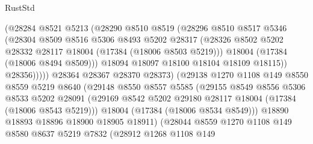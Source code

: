 \begin{lexlean}{RustStd}
\begin{coremodule}
                          (@28284
                            @8521
                            @5213
                            (@28290
                              @8510
                              @8519
                              (@28296
                                @8510
                                @8517
                                @5346
                                (@28304
                                  @8509
                                  @8516
                                  @5306
                                  @8493
                                  @5202
                                  @28317
                                  (@28326
                                    @8502
                                    @5202
                                    @28332
                                    @28117
                                    @18004
                                    (@17384 (@18006 @8503 @5219)))
                                  @18004
                                  (@17384 (@18006 @8494 @8509)))
                                @18094
                                @18097
                                @18100
                                @18104
                                @18109
                                @18115))
                            @28356)))))
                  @28364
                  @28367
                  @28370
                  @28373)
                (@29138
                  @1270
                  @1108
                  @149
                  @8550
                  @8559
                  @5219
                  @8640
                  (@29148
                    @8550
                    @8557
                    @5585
                    (@29155
                      @8549
                      @8556
                      @5306
                      @8533
                      @5202
                      @28091
                      (@29169 @8542 @5202 @29180 @28117 @18004 (@17384 (@18006 @8543 @5219)))
                      @18004
                      (@17384 (@18006 @8534 @8549)))
                    @18890
                    @18893
                    @18896
                    @18900
                    @18905
                    @18911)
                  (@28044
                    @8559
                    @1270
                    @1108
                    @149
                    @8580
                    @8637
                    @5219
                    @7832
                    (@28912
                      @1268
                      @1108
                      @149

\end{coremodule}
\end{lexlean}
